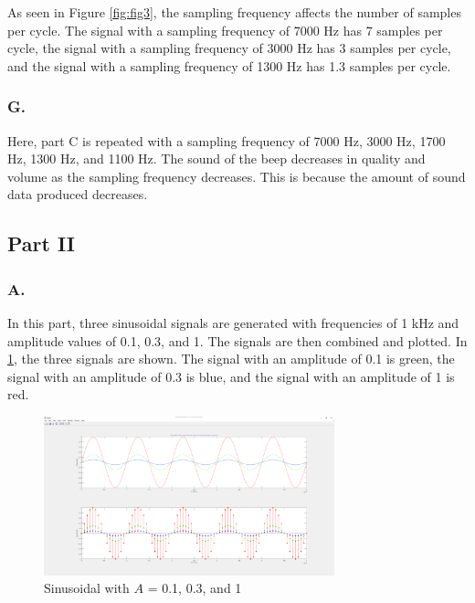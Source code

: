\documentclass{article}
\begin{document}
As seen in Figure \ref{fig:fig3}, the sampling frequency affects the number of samples
per cycle. The signal with a sampling frequency of 7000 Hz has 7 samples per cycle, 
the signal with a sampling frequency of 3000 Hz has 3 samples per cycle, and the signal
with a sampling frequency of 1300 Hz has 1.3 samples per cycle. 

\subsubsection*{G.}
Here, part C is repeated with a sampling frequency of 7000 Hz, 3000 Hz, 1700 Hz, 
1300 Hz, and 1100 Hz. The sound of the beep decreases in quality and volume as the 
sampling frequency decreases. This is because the amount of sound data produced decreases.

\subsection*{Part II}
\subsubsection*{A.}
In this part, three sinusoidal signals are generated with frequencies of 1 kHz and 
amplitude values of 0.1, 0.3, and 1. The signals are then combined and plotted. In 
\ref{fig:fig4}, the three signals are shown. The signal with an amplitude of 0.1 is green,
the signal with an amplitude of 0.3 is blue, and the signal with an amplitude of 1 is red.
\begin{figure}[H]
	\centering
	\includegraphics[width=0.75\textwidth]{fig 2a.png}
	\caption{Sinusoidal with $A$ = 0.1, 0.3, and 1}
	\label{fig:fig4}
\end{figure}
\end{document}
